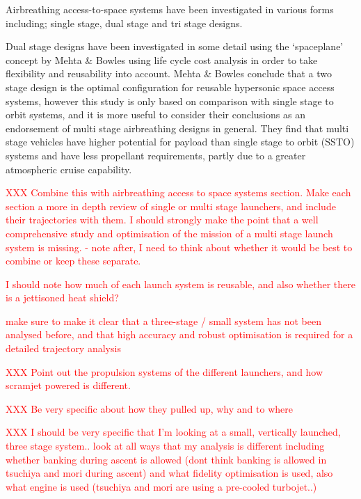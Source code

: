     
    
Airbreathing access-to-space systems have been investigated in various forms including; single stage\cite{Powell1991,Varvill2008,Trefny1999,Roche2000,Young2006,Bradford2000}, dual stage\cite{Tsuchiya2005,Mehta2001,Gong2014,Wilhite1991} and tri stage\cite{Preller2017b} designs. 
  
  Dual stage designs have been investigated in some detail using the `spaceplane' concept by Mehta \& Bowles\cite{Mehta2001} using life cycle cost analysis in order to take flexibility and reusability into account. Mehta \& Bowles conclude that a two stage design is the optimal configuration for reusable hypersonic space access systems, however this study is only based on comparison with single stage to orbit systems, and it is more useful to consider their conclusions as an endorsement of multi stage airbreathing designs in general. They find that multi stage vehicles have higher potential for payload than single stage to orbit (SSTO) systems and have less propellant requirements, partly due to a greater atmospheric cruise capability. 
  
  
  
  
  \textcolor{red}{XXX Combine this with airbreathing access to space systems section. Make each section a more in depth review of single or multi stage launchers, and include their trajectories with them. I should strongly make the point that a well comprehensive study and optimisation of the mission of a multi stage launch system is missing. - note after, I need to think about whether it would be best to combine or keep these separate.}
  
  \textcolor{red}{I should note how much of each launch system is reusable, and also whether there is a jettisoned heat shield?}
  
  \textcolor{red}{make sure to make it clear that a three-stage / small system has not been analysed before, and that high accuracy and robust optimisation is required for a detailed trajectory analysis}
  
  \textcolor{red}{XXX Point out the propulsion systems of the different launchers, and how scramjet powered is different.}
  
  \textcolor{red}{XXX Be very specific about how they pulled up, why and to where}
  
  \textcolor{red}{XXX I should be very specific that I'm looking at a small, vertically launched, three stage system.. look at all ways that my analysis is different including whether banking during ascent is allowed (dont think banking is allowed in tsuchiya and mori during ascent) and what fidelity optimisation is used, also what engine is used (tsuchiya and mori are using a pre-cooled turbojet..)}
  
